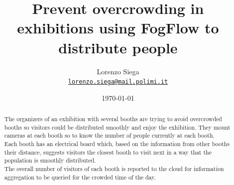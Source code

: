 \documentclass[11pt]{article}
\title{Prevent overcrowding in exhibitions using FogFlow to distribute people}
\author{Lorenzo Siega\\
    \href{mailto:lorenzo.siega@mail.polimi.it}{\texttt{lorenzo.siega@mail.polimi.it}}
}
\date{\today}
\begin{document}
 {
    \maketitle
    
    \begin{abstract}
    The organizers of an exhibition with several booths are trying to avoid overcrowded booths so visitors could be distributed smoothly and enjoy the exhibition. They mount cameras at each booth so to know the number of people currently at each booth.\\
    Each booth has an electrical board which, based on the information from other booths their distance, suggests visitors the closest booth to visit next in a way that the population is smoothly distributed.\\
    The overall number of visitors of each booth is reported to the cloud for information aggregation to be queried for the crowded time of the day.
    \end{abstract}
}
\end{document}
